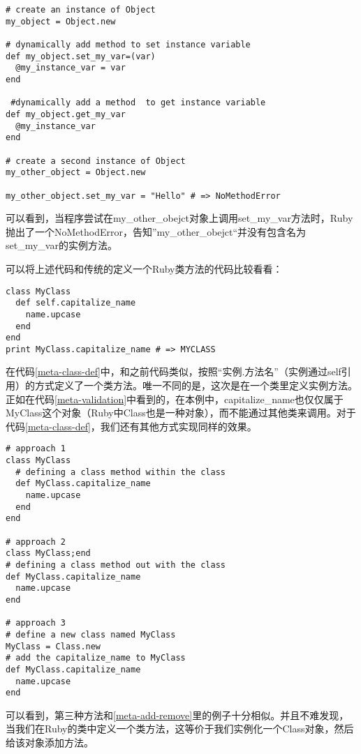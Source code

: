 \begin{lstlisting}[caption={验证动态添加的方法仅对该对象有效}, label=meta-validation]
# create an instance of Object
my_object = Object.new

# dynamically add method to set instance variable
def my_object.set_my_var=(var)
  @my_instance_var = var
end

 #dynamically add a method  to get instance variable
def my_object.get_my_var
  @my_instance_var
end

# create a second instance of Object
my_other_object = Object.new

my_other_object.set_my_var = "Hello" # => NoMethodError
\end{lstlisting}

可以看到，当程序尝试在my\_other\_obejct对象上调用set\_my\_var方法时，Ruby抛出了一个NoMethodError，告知”my\_other\_obejct“并没有包含名为set\_my\_var的实例方法。

可以将上述代码和传统的定义一个Ruby类方法的代码比较看看：

\begin{lstlisting}[caption={定义一个类方法}, label=meta-class-def]
class MyClass
  def self.capitalize_name
    name.upcase
  end
end
print MyClass.capitalize_name # => MYCLASS
\end{lstlisting}

在代码\ref{meta-class-def}中，和之前代码类似，按照“实例.方法名”（实例通过self引用）的方式定义了一个类方法。唯一不同的是，这次是在一个类里定义实例方法。正如在代码\ref{meta-validation}中看到的，在本例中，capitalize\_name也仅仅属于MyClass这个对象（Ruby中Class也是一种对象），而不能通过其他类来调用。对于代码\ref{meta-class-def}，我们还有其他方式实现同样的效果。


\begin{lstlisting}[caption={其他定义类方法的例子}, label=meta-class-def-opt]
# approach 1
class MyClass
  # defining a class method within the class 
  def MyClass.capitalize_name
    name.upcase
  end
end

# approach 2
class MyClass;end
# defining a class method out with the class
def MyClass.capitalize_name
  name.upcase
end

# approach 3
# define a new class named MyClass
MyClass = Class.new
# add the capitalize_name to MyClass
def MyClass.capitalize_name
  name.upcase
end
\end{lstlisting}

可以看到，第三种方法和\ref{meta-add-remove}里的例子十分相似。并且不难发现，当我们在Ruby的类中定义一个类方法，这等价于我们实例化一个Class对象，然后给该对象添加方法。

